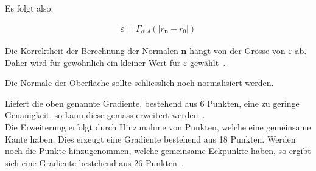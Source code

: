 Es folgt also:

\begin{gather}
    \varepsilon = \Gamma_{\alpha, \delta}(|r_{\bm{n}} - r_0|)
\end{gather}

Die Korrektheit der Berechnung der Normalen $\bm{n}$ hängt von der
Grösse von $\varepsilon$ ab. Daher wird für gewöhnlich ein kleiner Wert
für $\varepsilon$ gewählt~\parencite[S. 293]{hart_ray_1989}.

Die Normale der Oberfläche sollte schliesslich noch normalisiert werden.

Liefert die oben genannte Gradiente, bestehend aus 6 Punkten, eine zu
geringe Genauigkeit, so kann diese gemäss \citeauthor{hart_ray_1989}
erweitert werden~\parencite[S. 293]{hart_ray_1989}.\\
Die Erweiterung erfolgt durch Hinzunahme von Punkten, welche eine
gemeinsame Kante haben. Dies erzeugt eine Gradiente bestehend aus 18
Punkten. Werden noch die Punkte hinzugenommen, welche gemeinsame
Eckpunkte haben, so ergibt sich eine Gradiente bestehend aus 26
Punkten~\parencite[S. 293]{hart_ray_1989}.
